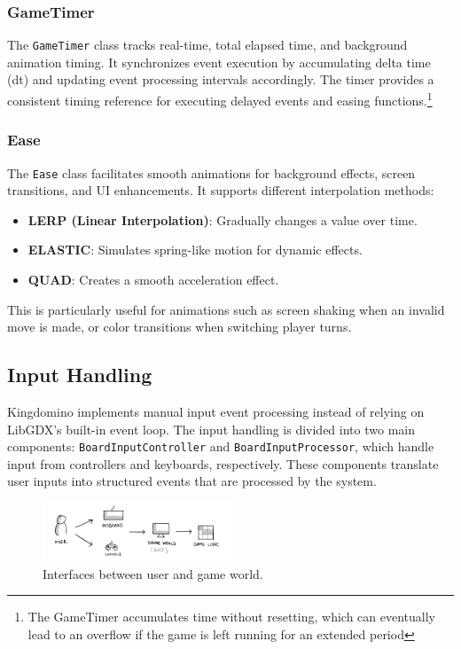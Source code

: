 \documentclass[conference]{IEEEtran}
\begin{document}
\subsubsection{GameTimer}
The \texttt{GameTimer} class tracks real-time, total elapsed time, and
background animation timing. It synchronizes event execution by accumulating
delta time (dt) and updating event processing intervals accordingly. The timer
provides a consistent timing reference for executing delayed events and easing
functions.\footnote{The GameTimer accumulates time without resetting, which can
    eventually lead to an overflow if the game is left running for an extended
    period}

\subsubsection{Ease}
The \texttt{Ease} class facilitates smooth animations for background effects,
screen transitions, and UI enhancements. It supports different interpolation
methods:
\begin{itemize}
    \item \textbf{LERP (Linear Interpolation)}: Gradually changes a value over time.
    \item \textbf{ELASTIC}: Simulates spring-like motion for dynamic effects.
    \item \textbf{QUAD}: Creates a smooth acceleration effect.
\end{itemize}
This is particularly useful for animations such as screen shaking when an invalid move is made, or color transitions when switching player turns.

\subsection{Input Handling}
Kingdomino implements manual input event processing instead of relying on
LibGDX's built-in event loop. The input handling is divided into two main
components: \texttt{BoardInputController} and \texttt{BoardInputProcessor},
which handle input from controllers and keyboards, respectively. These
components translate user inputs into structured events that are processed by
the system.

\begin{figure}[htbp]
    \centerline{\includegraphics[width=0.5\textwidth]{assets/interaction.png}}
    \caption{Interfaces between user and game world.}\label{fig:interaction}
\end{figure}
\end{document}
